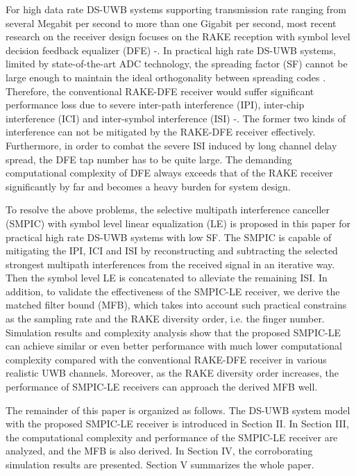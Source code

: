 \documentclass[journal]{IEEEtran}
\begin{document}
For high data rate DS-UWB systems supporting transmission rate
ranging from several Megabit per second to more than one Gigabit per
second, most recent research on the receiver design focuses on the
RAKE reception with symbol level decision feedback equalizer (DFE)
\cite{EQ1}-\cite{EQ3}. In practical high rate DS-UWB systems,
limited by state-of-the-art ADC technology, the spreading factor
(SF) cannot be large enough to maintain the ideal orthogonality
between spreading codes \cite{ADC}. Therefore, the conventional
RAKE-DFE receiver would suffer significant performance loss due to
severe inter-path interference (IPI), inter-chip interference (ICI)
and inter-symbol interference (ISI) \cite{Interference
ICC}-\cite{Low-SF}. The former two kinds of interference can not be
mitigated by the RAKE-DFE receiver effectively. Furthermore, in
order to combat the severe ISI induced by long channel delay spread,
the DFE tap number has to be quite large. The demanding
computational complexity of DFE always exceeds that of the RAKE
receiver significantly by far and becomes a heavy burden for system
design.

To resolve the above problems, the selective multipath interference
canceller (SMPIC) with symbol level linear equalization (LE) is
proposed in this paper for practical high rate DS-UWB systems with
low SF. The SMPIC is capable of mitigating the IPI, ICI and ISI by
reconstructing and subtracting the selected strongest multipath
interferences from the received signal in an iterative way. Then the
symbol level LE is concatenated to alleviate the remaining ISI. In
addition, to validate the effectiveness of the SMPIC-LE receiver, we
derive the matched filter bound (MFB), which takes into account such
practical constrains as the sampling rate and the RAKE diversity
order, i.e. the finger number. Simulation results and complexity
analysis show that the proposed SMPIC-LE can achieve similar or even
better performance with much lower computational complexity compared
with the conventional RAKE-DFE receiver in various realistic UWB
channels. Moreover, as the RAKE diversity order increases, the
performance of SMPIC-LE receivers can approach the derived MFB well.

The remainder of this paper is organized as follows. The DS-UWB
system model with the proposed SMPIC-LE receiver is introduced in
Section II. In Section III, the computational complexity and
performance of the SMPIC-LE receiver are analyzed, and the MFB is also
derived. In Section IV, the corroborating simulation results are
presented. Section V summarizes the whole paper.
\end{document}
